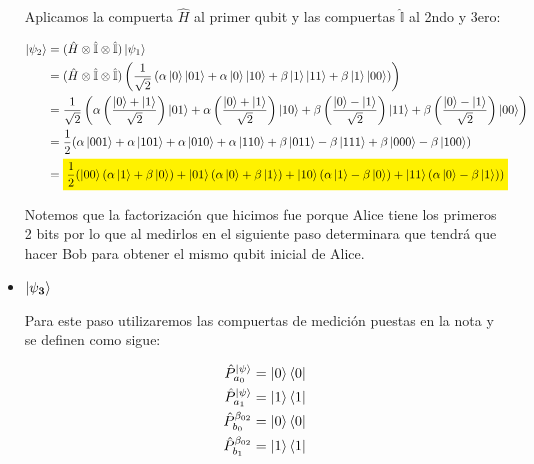 \begin{itemize}
        Aplicamos la compuerta $\hat{H}$ al primer qubit y las compuertas $\hat{\mathbb{I}}$ al
        2ndo y 3ero:

        \begin{align*}
            \ket{\psi_2} &= (\hat{H} \otimes \hat{\mathbb{I}}\otimes \hat{\mathbb{I}}) \ket{\psi_1} \\
            &= (\hat{H} \otimes \hat{\mathbb{I}}\otimes \hat{\mathbb{I}})
            \left(\frac{1}{\sqrt{2}}\left(\alpha\ket{0}\ket{01}+\alpha\ket{0}\ket{10}+\beta\ket{1}\ket{11}+\beta\ket{1}\ket{00}\right)\right) \\
            &=\frac{1}{\sqrt{2}}\left(\alpha\left(\frac{\ket{0}+\ket{1}}{\sqrt{2}}\right)\ket{01}+\alpha\left(\frac{\ket{0}+\ket{1}}{\sqrt{2}}\right)\ket{10}+\beta\left(\frac{\ket{0}-\ket{1}}{\sqrt{2}}\right)\ket{11}+\beta\left(\frac{\ket{0}-\ket{1}}{\sqrt{2}}\right)\ket{00}\right)\\
            &= \frac{1}{2} (\alpha\ket{001}+\alpha\ket{101}+ \alpha\ket{010}+\alpha\ket{110}+
            \beta\ket{011}-\beta\ket{111}+\beta\ket{000}-\beta\ket{100}) \\
            &=\mathcolorbox{yellow}{\frac{1}{2}(\ket{00}(\alpha\ket{1}+\beta\ket{0})+\ket{01}(\alpha\ket{0}+\beta\ket{1})+\ket{10}(\alpha\ket{1}-\beta\ket{0})+\ket{11}(\alpha\ket{0}-\beta\ket{1}))} \\
        \end{align*}

        Notemos que la factorización que hicimos fue porque Alice tiene los primeros 2 bits por
        lo que al medirlos en el siguiente paso determinara que tendrá que hacer Bob para
        obtener el mismo qubit inicial de Alice. \vspace{.3cm}

    \item $\mathbf{\ket{\psi_3}}$\vspace{.3cm}

        Para este paso utilizaremos las compuertas de medición puestas en la nota y se definen
        como sigue:

        \begin{align*}
            \hat{P}_{a_0}^{\ket{\psi}} = \ket{0}\bra{0} \\
            \hat{P}_{a_1}^{\ket{\psi}} = \ket{1}\bra{1} \\
            \hat{P}_{b_0}^{\beta_{02}} = \ket{0}\bra{0} \\
            \hat{P}_{b_1}^{\beta_{02}} = \ket{1}\bra{1} \\
        \end{align*}


\end{itemize}
